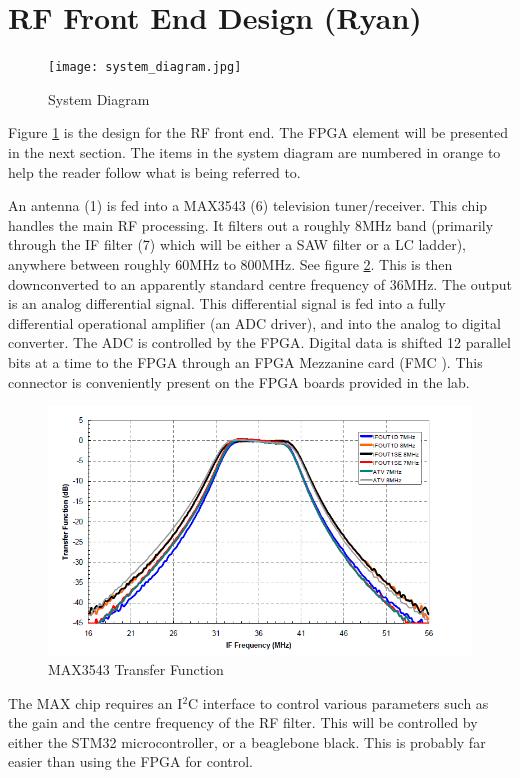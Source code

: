 \documentclass[a4paper, 12pt]{article}
\begin{document}
\section{RF Front End Design (Ryan)}

\begin{figure}
\caption{System Diagram}
\label{fig:system_diagram}
\centerline{\texttt{[image: system\_diagram.jpg]}}
\end{figure}

Figure \ref{fig:system_diagram} is the design for the RF front end.  The FPGA element will be presented in the next section.  The items in the system diagram are numbered in orange to help the reader follow what is being referred to.

An antenna (1) is fed into a MAX3543 (6) television tuner/receiver.  This chip handles the main RF processing.  It filters out a roughly 8MHz band (primarily through the IF filter (7) which will be either a SAW filter or a LC ladder), anywhere between roughly 60MHz to 800MHz.  See figure \ref{fig:transfer_function}.  This is then downconverted to an apparently standard centre frequency of 36MHz.  The output is an analog differential signal.  This differential signal is fed into a fully differential operational amplifier (an ADC driver), and into the analog to digital converter.  The ADC is controlled by the FPGA.  Digital data is shifted 12 parallel bits at a time to the FPGA through an FPGA Mezzanine card (FMC \cite{fmc}).  This connector is conveniently present on the FPGA boards provided in the lab.

\begin{figure}
\includegraphics[width=.48\textwidth]{../../../transfer_function.png}
\caption{MAX3543 Transfer Function}
\label{fig:transfer_function}
\end{figure}

The MAX chip requires an I$^2$C interface to control various parameters such as the gain and the centre frequency of the RF filter.  This will be controlled by either the STM32 microcontroller, or a beaglebone black.  This is probably far easier than using the FPGA for control.
\end{document}
